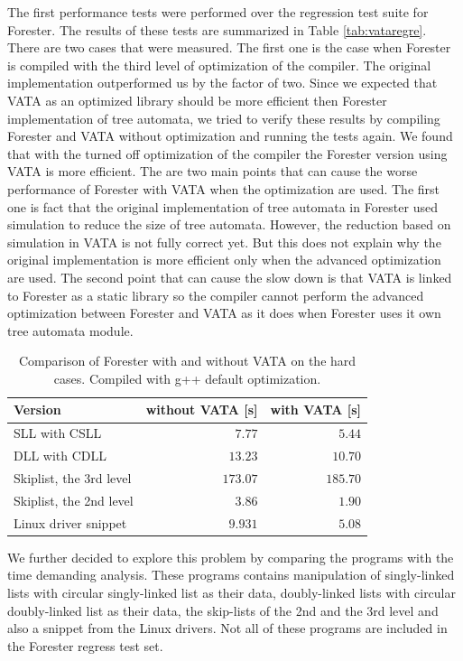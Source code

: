 The first performance tests were performed over the regression test suite for Forester.
The results of these tests are summarized in Table \ref{tab:vataregre}.
There are two cases that were measured.
The first one is the case when Forester is compiled with the third level of optimization of the compiler.
The original implementation outperformed us by the factor of two.
Since we expected that VATA as an optimized library should be more efficient
then Forester implementation of tree automata, we tried to verify these results
by compiling Forester and VATA without optimization and running the tests again.
We found that with the turned off optimization of the compiler
the Forester version using VATA is more efficient.
The are two main points that can cause the worse performance of Forester with VATA
when the optimization are used.
The first one is fact that the original implementation of tree automata
in Forester used simulation to reduce the size of tree automata.
However, the reduction based on simulation in VATA is not fully correct yet.
But this does not explain why the original implementation is more efficient
only when the advanced optimization are used.
The second point that can cause the slow down is
that VATA is linked to Forester as a static library so the compiler cannot
perform the advanced optimization between Forester and VATA as it does
when Forester uses it own tree automata module.


\begin{table}[bt]
	\vskip6pt
	\caption{Comparison of Forester with and without VATA on the hard cases.
		Compiled with g++ default optimization.
	}
	\centering
	\begin{tabular}{|l | r | r |}
		\hline
		Version & without VATA [s] & with VATA [s] \\
		\hline
		\hline
		SLL with CSLL            & $7.77$ & $5.44$ \\
		\hline
		DLL with CDLL            & $13.23$ & $10.70$ \\
		\hline
		Skiplist, the 3rd level  & $173.07$ & $185.70$ \\
		\hline
		Skiplist, the 2nd level  & $3.86$ & $1.90$ \\
		\hline
		Linux driver snippet     & $9.931$ & $5.08$  \\ 
		\hline
	\end{tabular}
	\label{tab:vatadef}
\end{table}

We further decided to explore this problem by comparing
the programs with the time demanding analysis.
These programs contains manipulation of singly-linked lists with
circular singly-linked list as their data, doubly-linked lists with
circular doubly-linked list as their data, the skip-lists of the 2nd and
the 3rd level and also a snippet from the Linux drivers.
Not all of these programs are included in the Forester regress test set.

